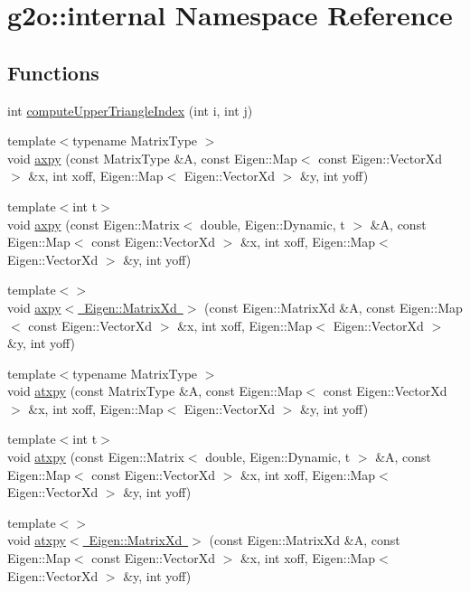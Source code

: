 \hypertarget{namespaceg2o_1_1internal}{}\section{g2o\+:\+:internal Namespace Reference}
\label{namespaceg2o_1_1internal}
\subsection*{Functions}
\begin{DoxyCompactItemize}
\item 
int \mbox{\hyperlink{namespaceg2o_1_1internal_abf695a74f7aced7ee804a58607ae434c}{compute\+Upper\+Triangle\+Index}} (int i, int j)
\item 
{\footnotesize template$<$typename Matrix\+Type $>$ }\\void \mbox{\hyperlink{namespaceg2o_1_1internal_a3beb413c2d04c629c60a8ce5e05ddf8f}{axpy}} (const Matrix\+Type \&A, const Eigen\+::\+Map$<$ const Eigen\+::\+Vector\+Xd $>$ \&x, int xoff, Eigen\+::\+Map$<$ Eigen\+::\+Vector\+Xd $>$ \&y, int yoff)
\item 
{\footnotesize template$<$int t$>$ }\\void \mbox{\hyperlink{namespaceg2o_1_1internal_a0656fb61cd6302ea0e3bf5f99890c05a}{axpy}} (const Eigen\+::\+Matrix$<$ double, Eigen\+::\+Dynamic, t $>$ \&A, const Eigen\+::\+Map$<$ const Eigen\+::\+Vector\+Xd $>$ \&x, int xoff, Eigen\+::\+Map$<$ Eigen\+::\+Vector\+Xd $>$ \&y, int yoff)
\item 
{\footnotesize template$<$$>$ }\\void \mbox{\hyperlink{namespaceg2o_1_1internal_abd59efa58c070f88c6890e10926d3410}{axpy$<$ Eigen\+::\+Matrix\+Xd $>$}} (const Eigen\+::\+Matrix\+Xd \&A, const Eigen\+::\+Map$<$ const Eigen\+::\+Vector\+Xd $>$ \&x, int xoff, Eigen\+::\+Map$<$ Eigen\+::\+Vector\+Xd $>$ \&y, int yoff)
\item 
{\footnotesize template$<$typename Matrix\+Type $>$ }\\void \mbox{\hyperlink{namespaceg2o_1_1internal_ad176878dff85b91f1dbabed52cbf696e}{atxpy}} (const Matrix\+Type \&A, const Eigen\+::\+Map$<$ const Eigen\+::\+Vector\+Xd $>$ \&x, int xoff, Eigen\+::\+Map$<$ Eigen\+::\+Vector\+Xd $>$ \&y, int yoff)
\item 
{\footnotesize template$<$int t$>$ }\\void \mbox{\hyperlink{namespaceg2o_1_1internal_a00b6a24b76a3fadc09136fe6232578ec}{atxpy}} (const Eigen\+::\+Matrix$<$ double, Eigen\+::\+Dynamic, t $>$ \&A, const Eigen\+::\+Map$<$ const Eigen\+::\+Vector\+Xd $>$ \&x, int xoff, Eigen\+::\+Map$<$ Eigen\+::\+Vector\+Xd $>$ \&y, int yoff)
\item 
{\footnotesize template$<$$>$ }\\void \mbox{\hyperlink{namespaceg2o_1_1internal_a063a16cf91e9762c9ce6c387463cf716}{atxpy$<$ Eigen\+::\+Matrix\+Xd $>$}} (const Eigen\+::\+Matrix\+Xd \&A, const Eigen\+::\+Map$<$ const Eigen\+::\+Vector\+Xd $>$ \&x, int xoff, Eigen\+::\+Map$<$ Eigen\+::\+Vector\+Xd $>$ \&y, int yoff)
\end{DoxyCompactItemize}


